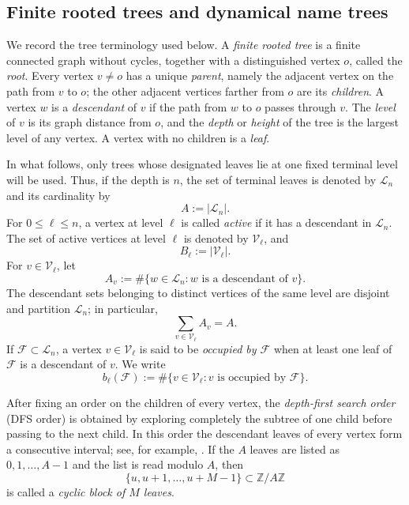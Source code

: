 \documentclass[10pt,a4paper]{amsart}
\newcommand{\Z}{\mathbb Z}
\numberwithin{equation}{section}
\begin{document}
	\subsection{Finite rooted trees and dynamical name trees}\label{sec:name trees}

	We record the tree terminology used below.  A \emph{finite rooted tree} is a
	finite connected graph without cycles, together with a distinguished vertex
	$o$, called the \emph{root}.  Every vertex $v\neq o$ has a unique
	\emph{parent}, namely the adjacent vertex on the path from $v$ to $o$; the
	other adjacent vertices farther from $o$ are its \emph{children}.  A vertex
	$w$ is a \emph{descendant} of $v$ if the path from $w$ to $o$ passes through
	$v$.  The \emph{level} of $v$ is its graph distance from $o$, and the
	\emph{depth} or \emph{height} of the tree is the largest level of any vertex.  A vertex with
	no children is a \emph{leaf}.

	In what follows, only trees whose designated leaves lie at one fixed terminal level will be used.  Thus, if the depth is $n$, the set of terminal leaves is denoted by
	$\mathcal L_n$ and its cardinality by
	\[
	A:=|\mathcal L_n|.
	\]
	For $0\leq\ell\leq n$, a vertex at level $\ell$ is called \emph{active} if
	it has a descendant in $\mathcal L_n$.  The set of active vertices at level
	$\ell$ is denoted by $\mathcal V_\ell$, and
	\[
	B_\ell:=|\mathcal V_\ell|.
	\]
	For $v\in\mathcal V_\ell$, let
	\[
	A_v:=\#\{w\in\mathcal L_n:w\text{ is a descendant of }v\}.
	\]
	The descendant sets belonging to distinct vertices of the same level are
	disjoint and partition $\mathcal L_n$; in particular,
	\begin{equation}
		\sum_{v\in\mathcal V_\ell}A_v=A.
		\label{eq:descendant-partition}
	\end{equation}
	If $\mathcal F\subset\mathcal L_n$, a vertex $v\in\mathcal V_\ell$ is said to be
	\emph{occupied by $\mathcal F$} when at least one leaf of $\mathcal F$ is a
	descendant of $v$.  We write
	\[
	b_\ell(\mathcal F)
	:=
	\#\{v\in\mathcal V_\ell:v\text{ is occupied by }\mathcal F\}.
	\]

	After fixing an order on the children of every vertex, the \emph{depth-first
	search order} (DFS order) is obtained by exploring completely the subtree of
	one child before passing to the next child.  In this order the descendant
	leaves of every vertex form a consecutive interval; see, for example,
	\cite{Tarjan1972,CLRS2022}.  If the $A$ leaves are
	listed as $0,1,\ldots,A-1$ and the list is read modulo $A$, then
	\[
	\{u,u+1,\ldots,u+M-1\}\subset\Z/A\Z
	\]
	is called a \emph{cyclic block of $M$ leaves}.
\end{document}

